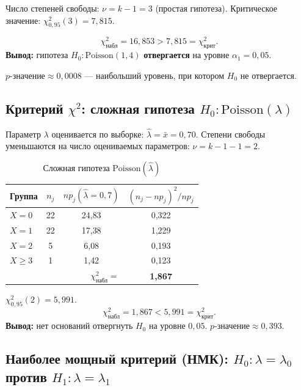 \documentclass[12pt,a4paper]{article}
\newcommand{\lahat}{\hat{\lambda}}
\newcommand{\xbar}{\bar{x}}
\begin{document}
	Число степеней свободы: $\nu = k - 1 = 3$ (простая гипотеза).
	Критическое значение: $\chi^2_{0{,}95}(3) = 7{,}815$.
	
	\[
	\chi^2_{\text{набл}} = 16{,}853 > 7{,}815 = \chi^2_{\text{крит}}.
	\]
	\textbf{Вывод:} гипотеза $H_0\colon\mathrm{Poisson}(1{,}4)$ \textbf{отвергается} на уровне $\alpha_1 = 0{,}05$.
	
	$p\text{-значение} \approx 0{,}0008$ — наибольший уровень, при котором $H_0$ не отвергается.
	
	\subsection{Критерий \texorpdfstring{$\chi^2$}{chi2}: сложная гипотеза
		\texorpdfstring{$H_0\colon\mathrm{Poisson}(\lambda)$}{}}
	
	Параметр $\lambda$ оценивается по выборке: $\lahat = \xbar = 0{,}70$.
	Степени свободы уменьшаются на число оцениваемых параметров: $\nu = k - 1 - 1 = 2$.
	
	\begin{table}[H]
		\centering
		\begin{tabular}{lccc}
			\toprule
			Группа & $n_j$ & $np_j(\lahat{=}0{,}7)$ & $(n_j - np_j)^2/np_j$ \\
			\midrule
			$X=0$   & 22 & 24{,}83 & 0{,}322 \\
			$X=1$   & 22 & 17{,}38 & 1{,}229 \\
			$X=2$   &  5 &  6{,}08 & 0{,}193 \\
			$X\ge3$ &  1 &  1{,}42 & 0{,}123 \\
			\bottomrule
			\multicolumn{3}{r}{$\chi^2_{\text{набл}} =$} & \textbf{1{,}867} \\
		\end{tabular}
		\caption{Сложная гипотеза $\mathrm{Poisson}(\lahat)$}
	\end{table}
	
	$\chi^2_{0{,}95}(2) = 5{,}991$.
	\[
	\chi^2_{\text{набл}} = 1{,}867 < 5{,}991 = \chi^2_{\text{крит}}.
	\]
	\textbf{Вывод:} нет оснований отвергнуть $H_0$ на уровне $0{,}05$.
	$p\text{-значение} \approx 0{,}393$.
	
	\subsection{Наиболее мощный критерий (НМК):
		\texorpdfstring{$H_0\colon\lambda=\lambda_0$}{} против
		\texorpdfstring{$H_1\colon\lambda=\lambda_1$}{}}
	
\end{document}
